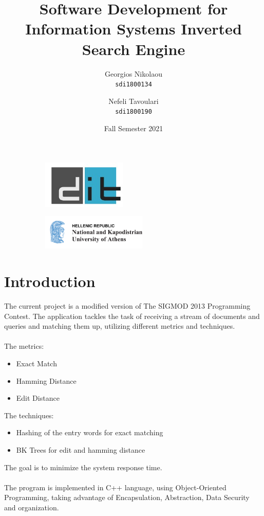 \documentclass{article}
\title{%
\HUGE
Software Development for Information Systems \LARGE Inverted Search Engine}
\begin{document}
\author{\Large
  Georgios Nikolaou\\
   \texttt{\large sdi1800134}
  \and
  \Large
  Nefeli Tavoulari\\
   \texttt{\large sdi1800190}
}
\date{Fall Semester 2021}
\maketitle
\begin{figure}
\centering
\begin{subfigure}
  \centering
  \includegraphics[width=40mm]{dit_logo}
  \label{fig:sub1}
\end{subfigure}%
\begin{subfigure}
  \centering
  \includegraphics[width=50mm]{NKUA_logo}
  \label{fig:sub2}
\end{subfigure}
\label{fig:test}
\end{figure}


\newpage
\tableofcontents
\newpage
\section{Introduction} \large
The current project is a modified version of The SIGMOD 2013 Programming Contest.
The application tackles the task of receiving a stream of documents and queries and matching them up, utilizing different metrics and techniques. \\ \\
The metrics:
\begin{itemize}
    \item Exact Match
    \item Hamming Distance
    \item Edit Distance
\end{itemize}
The techniques:
\begin{itemize}
    \item Hashing of the entry words for exact matching
    \item BK Trees for edit and hamming distance
\end{itemize}
The goal is to minimize the system response time. \\ \\
The program is implemented in C++ language, using Object-Oriented Programming, taking advantage of Encapsulation, Abstraction, Data Security and organization.
\newpage
\end{document}
